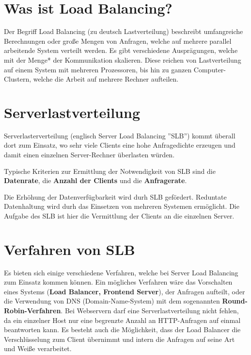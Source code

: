 


\section{Was ist Load Balancing?}
Der Begriff Load Balancing (zu deutsch Lastverteilung) beschreibt umfangreiche Berechnungen oder große Mengen von Anfragen, welche auf mehrere parallel arbeitende System verteilt werden. Es gibt verschiedene Ausprägungen, welche mit der Menge* der Kommunikation skalieren. Diese reichen von
Lastverteilung auf einem System mit mehreren Prozessoren, bis hin zu ganzen Computer-Clustern, welche die Arbeit auf mehrere Rechner aufteilen.

\section{Serverlastverteilung}

Serverlasterverteilung (englisch Server Load Balancing ''SLB'') kommt überall dort zum Einsatz, wo sehr viele Clients eine hohe Anfragedichte erzeugen und damit einen einzelnen Server-Rechner überlasten würden.\newline

Typische Kriterien zur Ermittlung der Notwendigkeit von SLB sind die \textbf{Datenrate}, die \textbf{Anzahl der Clients} und die \textbf{Anfragerate}. \newline

Die Erhöhung der Datenverfügbarkeit wird durh SLB gefördert. Reduntate Datenhaltung wird durh das Einsetzen von mehreren Systemen ermöglicht. Die Aufgabe des SLB ist hier die Vermittlung der Clients an die einzelnen Server. \newline

\section{Verfahren von SLB}
Es bieten sich einige verschiedene Verfahren, welche bei Server Load Balancing zum Einsatz kommen können. Ein mögliches Verfahren wäre das Vorschalten eines Systems (\textbf{Load Balancer, Frontend Server}), der Anfragen aufteilt, oder die Verwendung von DNS (Domain-Name-System) mit dem sogenannten \textbf{Round-Robin-Verfahren}. Bei Webservern darf eine Serverlastverteilung nicht fehlen, da ein einzelner Host nur eine begrenzte Anzahl an HTTP-Anfragen auf einmal beantworten kann. Es besteht auch die Möglichkeit, dass der Load Balancer die Verschlüsselung zum Client übernimmt und intern die Anfragen auf seine Art und Weiße verarbeitet. \newline

